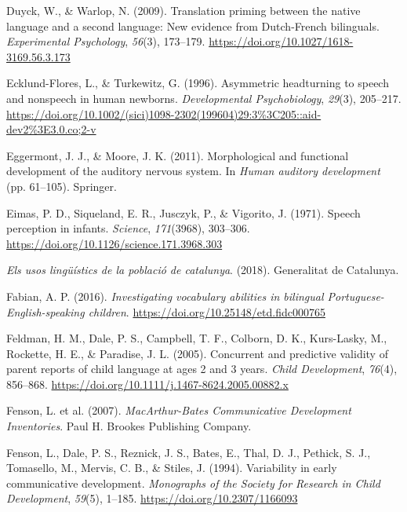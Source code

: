 \documentclass[
  12pt,
  b5paperpaper,
  twoside]{scrreprt}
\newlength{\cslhangindent}
\newlength{\cslentryspacingunit} %
\newenvironment{CSLReferences}[2] %
 {%
  \setlength{\parindent}{0pt}
  \ifodd #1
  \let\oldpar\par
  \def\par{\hangindent=\cslhangindent\oldpar}
  \fi
  \setlength{\parskip}{#2\cslentryspacingunit}
 }%
 {}
\begin{document}
\begin{CSLReferences}{1}{0}
\leavevmode{}%
Duyck, W., \& Warlop, N. (2009). Translation priming between the native
language and a second language: New evidence from {Dutch-French}
bilinguals. \emph{Experimental Psychology}, \emph{56}(3), 173--179.
\url{https://doi.org/10.1027/1618-3169.56.3.173}

\leavevmode{}%
Ecklund-Flores, L., \& Turkewitz, G. (1996). Asymmetric headturning to
speech and nonspeech in human newborns. \emph{Developmental
Psychobiology}, \emph{29}(3), 205--217.
\url{https://doi.org/10.1002/(sici)1098-2302(199604)29:3\%3C205::aid-dev2\%3E3.0.co;2-v}

\leavevmode{}%
Eggermont, J. J., \& Moore, J. K. (2011). Morphological and functional
development of the auditory nervous system. In \emph{Human auditory
development} (pp. 61--105). {Springer}.

\leavevmode{}%
Eimas, P. D., Siqueland, E. R., Jusczyk, P., \& Vigorito, J. (1971).
Speech perception in infants. \emph{Science}, \emph{171}(3968),
303--306. \url{https://doi.org/10.1126/science.171.3968.303}

\leavevmode{}%
\emph{Els usos ling{ü}{í}stics de la poblaci{ó} de catalunya}. (2018).
{Generalitat de Catalunya}.

\leavevmode{}%
Fabian, A. P. (2016). \emph{Investigating vocabulary abilities in
bilingual {Portuguese-English-speaking} children}.
\url{https://doi.org/10.25148/etd.fidc000765}

\leavevmode{}%
Feldman, H. M., Dale, P. S., Campbell, T. F., Colborn, D. K.,
Kurs-Lasky, M., Rockette, H. E., \& Paradise, J. L. (2005). Concurrent
and predictive validity of parent reports of child language at ages 2
and 3 years. \emph{Child Development}, \emph{76}(4), 856--868.
\url{https://doi.org/10.1111/j.1467-8624.2005.00882.x}

\leavevmode{}%
Fenson, L. et al. (2007). \emph{{MacArthur-Bates Communicative
Development Inventories}}. {Paul H. Brookes Publishing Company}.

\leavevmode{}%
Fenson, L., Dale, P. S., Reznick, J. S., Bates, E., Thal, D. J.,
Pethick, S. J., Tomasello, M., Mervis, C. B., \& Stiles, J. (1994).
Variability in early communicative development. \emph{Monographs of the
Society for Research in Child Development}, \emph{59}(5), 1--185.
\url{https://doi.org/10.2307/1166093}


\end{CSLReferences}
\end{document}
